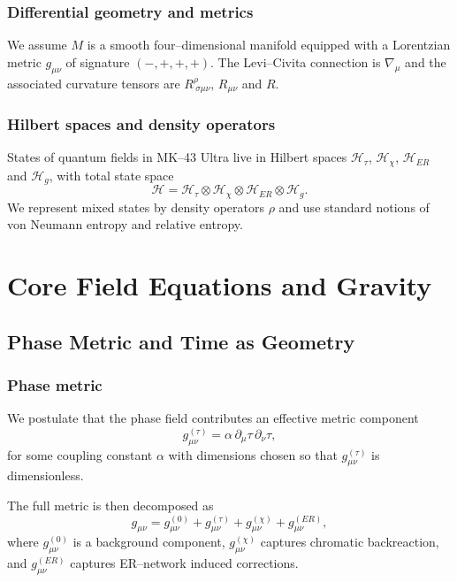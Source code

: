 \section{Differential geometry and metrics}

We assume $M$ is a smooth four--dimensional manifold equipped with a Lorentzian metric $g_{\mu\nu}$ of signature $(-,+,+,+)$.
The Levi--Civita connection is $\nabla_\mu$ and the associated curvature tensors are $R^\rho_{\ \sigma\mu\nu}$, $R_{\mu\nu}$ and $R$.

\section{Hilbert spaces and density operators}

States of quantum fields in MK--43 Ultra live in Hilbert spaces $\mathcal{H}_\tau$, $\mathcal{H}_\chi$, $\mathcal{H}_{ER}$ and $\mathcal{H}_g$, with total state space
\[
  \mathcal{H} = \mathcal{H}_\tau \otimes \mathcal{H}_\chi \otimes \mathcal{H}_{ER} \otimes \mathcal{H}_g.
\]
We represent mixed states by density operators $\rho$ and use standard notions of von Neumann entropy and relative entropy.

\part{Core Field Equations and Gravity}

\chapter{Phase Metric and Time as Geometry}

\section{Phase metric}

We postulate that the phase field contributes an effective metric component
\begin{equation}
  g^{(\tau)}_{\mu\nu} = \alpha\, \partial_\mu \tau\, \partial_\nu \tau,
  \label{eq:phase-metric}
\end{equation}
for some coupling constant $\alpha$ with dimensions chosen so that $g^{(\tau)}_{\mu\nu}$ is dimensionless.

The full metric is then decomposed as
\begin{equation}
  g_{\mu\nu} = g^{(0)}_{\mu\nu} + g^{(\tau)}_{\mu\nu} + g^{(\chi)}_{\mu\nu} + g^{(ER)}_{\mu\nu},
\end{equation}
where $g^{(0)}_{\mu\nu}$ is a background component, $g^{(\chi)}_{\mu\nu}$ captures chromatic backreaction, and $g^{(ER)}_{\mu\nu}$ captures ER--network induced corrections.

